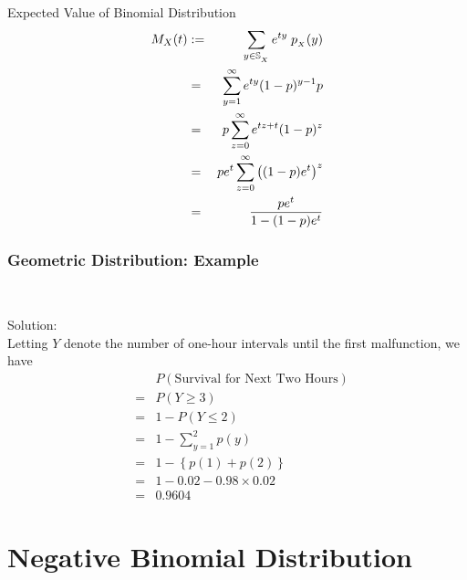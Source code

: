 \documentclass[compress]{beamer}
\begin{document}
\begin{frame}{Expected Value of Binomial Distribution}
\begin{eqnarray}
M_X(t)& := &  \sum_{y\in \support[X]} e^{ty}\; \pmf_{_X}(y) \nonumber\\
& = &  \sum_{y=1}^{\infty } e^{ty}  (1-p)^{y-1}p \nonumber\\
& = & p   \sum_{z=0}^{\infty } e^{tz+t}  (1-p)^{z} \nonumber\\
& = & pe^t   \sum_{z=0}^{\infty } \left((1-p)e^{t}\right)^z\nonumber\\
& = & \frac{pe^t}{1-(1-p)e^{t}} 
\end{eqnarray}



\end{frame}



\begin{frame}\frametitle{Geometric Distribution: Example}
\vspace{-.1in}
\\
\pause

\vspace{.1in}
{\tiny Solution: \\
Letting $Y$ denote the number of one-hour intervals until the first
malfunction, we have 
\begin{eqnarray}
& & P(\text{Survival for Next Two Hours})\nonumber\\
& =&  P(Y\geq 3)\nonumber\\
& =& 1- P(Y\leq 2)\nonumber\\
& = &1-   \sum_{y=1}^{2}p(y)\nonumber\\
& = &1-   \left\{ p(1)+p(2)\right\}\nonumber\\
& =& 1-0.02-0.98\times 0.02\nonumber\\
& =& 0.9604\nonumber
\end{eqnarray}
}

\end{frame}




\section{Negative Binomial Distribution }
\end{document}
